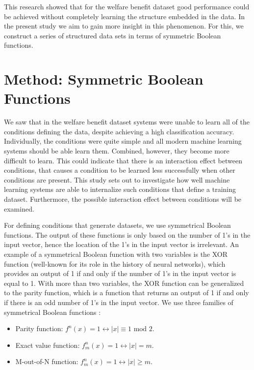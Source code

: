 \documentclass[letterpaper]{article} %
\begin{document}
This research showed that for the welfare benefit dataset good performance could be achieved without completely learning the structure embedded in the data. In the present study we aim to gain more insight in this phenomenon. For this, we construct a series of structured data sets in terms of symmetric Boolean functions.

\section{Method: Symmetric Boolean Functions}
We saw that in the welfare benefit dataset systems were unable to learn all of the conditions defining the data, despite achieving a high classification accuracy. Individually, the conditions were quite simple and all modern machine learning systems should be able learn them. Combined, however, they become more difficult to learn. This could indicate that there is an interaction effect between conditions, that causes a condition to be learned less successfully when other conditions are present. 
This study sets out to investigate how well machine learning systems are able to internalize such conditions that define a training dataset. Furthermore, the possible interaction effect between conditions will be examined.

For defining conditions that generate datasets, we use %
symmetrical Boolean functions. The output of these functions is only based on the number of 1's in the input vector, hence the location of the 1's in the input vector is irrelevant. An example of a symmetrical Boolean function with two variables is the XOR function (well-known for its role in the history of neural networks), which provides an output of 1 if and only if the number of 1's in the input vector is equal to 1. With more than two variables, the XOR function can be generalized to the parity function, which is a function that returns an output of 1 if and only if there is an odd number of 1's in the input vector. We use three families of symmetrical Boolean functions \cite{wegener1987complexity}:

\begin{itemize}
\item
Parity function:  $f^n(x) = 1 \leftrightarrow |x| \equiv 1 \text{ mod } 2$. 
\item
Exact value function:  $f^n_m(x) = 1 \leftrightarrow |x|= m$.
\item
M-out-of-N function: $f^n_m(x) = 1 \leftrightarrow |x| \geq m$. 
\end{itemize}
\end{document}
